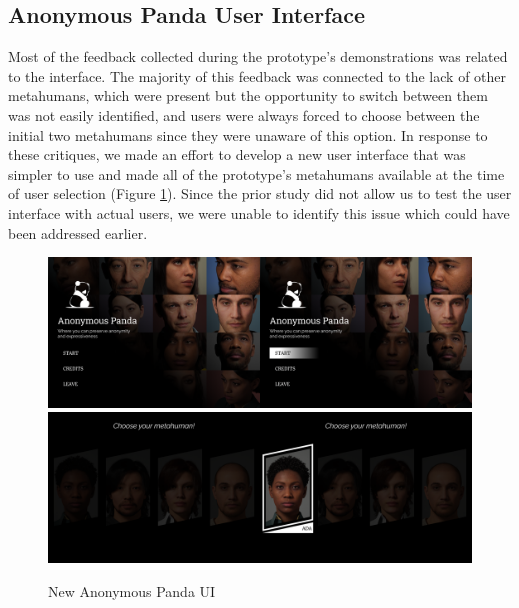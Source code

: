 
\subsection{Anonymous Panda User Interface}
Most of the feedback collected during the prototype's demonstrations was related to the interface. The majority of this feedback was connected to the lack of other metahumans, which were present but the opportunity to switch between them was not easily identified, and users were always forced to choose between the initial two metahumans since they were unaware of this option. In response to these critiques, we made an effort to develop a new user interface that was simpler to use and made all of the prototype's metahumans available at the time of user selection (Figure \ref{fig:newUI}). Since the prior study did not allow us to test the user interface with actual users, we were unable to identify this issue which could have been addressed earlier. %

\begin{figure}[!htb]
\includegraphics[width=\textwidth]{figures/startMenu.png}
\includegraphics[width=\textwidth]{figures/metahumanMenu.png}
\centering
\caption{New Anonymous Panda UI}
\label{fig:newUI}
\end{figure}
